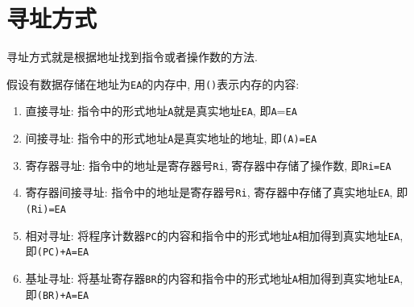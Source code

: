 \section{寻址方式}
寻址方式就是根据地址找到指令或者操作数的方法. \par 假设有数据存储在地址为\verb|EA|的内存中, 用\verb|()|表示内存的内容:
\begin{enumerate}
\item 直接寻址: 指令中的形式地址\verb|A|就是真实地址\verb|EA|, 即\verb|A|=\verb|EA|
\item 间接寻址: 指令中的形式地址\verb|A|是真实地址的地址, 即\verb|(A)=EA|
\item 寄存器寻址: 指令中的地址是寄存器号\verb|Ri|, 寄存器中存储了操作数, 即\verb|Ri=EA|
\item 寄存器间接寻址: 指令中的地址是寄存器号\verb|Ri|, 寄存器中存储了真实地址\verb|EA|, 即\verb|(Ri)=EA|
\item 相对寻址: 将程序计数器\verb|PC|的内容和指令中的形式地址\verb|A|相加得到真实地址\verb|EA|, 即\verb|(PC)+A=EA|
\item 基址寻址: 将基址寄存器\verb|BR|的内容和指令中的形式地址\verb|A|相加得到真实地址\verb|EA|, 即\verb|(BR)+A=EA|
\end{enumerate}












